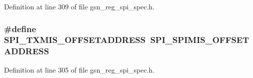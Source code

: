 Definition at line 309 of file gsn\_\-reg\_\-spi\_\-spec.h.

\hypertarget{a00573_a17fdcc0d678721c6e51d71df679e91a5}{
\subsubsection[{SPI\_\-TXMIS\_\-OFFSETADDRESS}]{\setlength{\rightskip}{0pt plus 5cm}\#define SPI\_\-TXMIS\_\-OFFSETADDRESS~SPI\_\-SPIMIS\_\-OFFSETADDRESS}}
\label{a00573_a17fdcc0d678721c6e51d71df679e91a5}


Definition at line 305 of file gsn\_\-reg\_\-spi\_\-spec.h.

